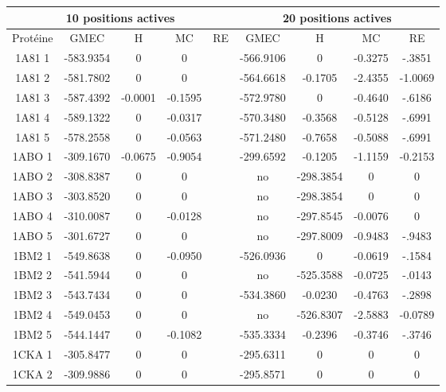 \documentclass[a4paper,12pt]{article}
\begin{document}
    \begin{table}[h]
      \centering

      \begin{tabular}{|c|c|c|c|c|c|c|c|c|}


        \hline
        \multicolumn{5}{|c|}{10 positions actives}  & \multicolumn{4}{|c|}{20 positions actives} \\
        \hline
        Protéine & GMEC & H & MC & RE & GMEC & H & MC & RE \\
        \hline
        1A81 1 & -583.9354 & 0 & 0 & & -566.9106 & 0 & -0.3275 & -.3851 \\             
        1A81 2 & -581.7802 & 0 & 0 & & -564.6618 & -0.1705 & -2.4355 & -1.0069 \\    
        1A81 3 & -587.4392 & -0.0001 & -0.1595 & & -572.9780 & 0 & -0.4640 & -.6186 \\       
        1A81 4 & -589.1322 & 0 & -0.0317 & & -570.3480 & -0.3568 & -0.5128 & -.6991 \\     
        1A81 5 & -578.2558 & 0 & -0.0563 & & -571.2480 & -0.7658 & -0.5088 & -.6991 \\     
        1ABO 1 & -309.1670 & -0.0675 & -0.9054 & & -299.6592 & -0.1205 & -1.1159 & -0.2153 \\    
        1ABO 2 & -308.8387 & 0 & 0 & & no & -298.3854 & 0 & 0 \\ 
        1ABO 3 & -303.8520 & 0 & 0 & & no & -298.3854 & 0 & 0 \\            
        1ABO 4 & -310.0087 & 0 & -0.0128 & & no & -297.8545 & -0.0076 & 0 \\          
        1ABO 5 & -301.6727 & 0 & 0 & & no & -297.8009 & -0.9483 & -.9483 \\       
        1BM2 1 & -549.8638 & 0 & -0.0950 & &   -526.0936 & 0 & -0.0619 & -.1584 \\        
        1BM2 2 & -541.5944 & 0 & 0 & & no & -525.3588 & -0.0725 & -.0143 \\       
        1BM2 3 & -543.7434 & 0 & 0 & & -534.3860 & -0.0230 & -0.4763 & -.2898 \\     
        1BM2 4 & -549.0453 & 0 & 0 & & no & -526.8307 & -2.5883 & -0.0789 \\       
        1BM2 5 & -544.1447 & 0 & -0.1082 & & -535.3334 & -0.2396 & -0.3746 & -.3746 \\     
        1CKA 1 & -305.8477 & 0 & 0 & & -295.6311 & 0 & 0 & 0\\  
        1CKA 2 & -309.9886 & 0 & 0 & & -295.8571 & 0 & 0 & 0 \\ 

\end{tabular}
\end{table}
\end{document}

